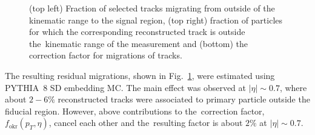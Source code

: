 \begin{figure}[b!]
\begin{subfigure}{.49\textwidth}
	\end{subfigure}
	\begin{minipage}{.49\textwidth}
		\caption{(top left) Fraction of selected tracks migrating from outside of the kinematic range to the signal region, (top right) fraction of particles for which the corresponding reconstructed track is outside the~kinematic range of the measurement and (bottom) the correction factor for migrations of tracks.}
		\label{fig:okr}
	\end{minipage}
\end{figure}

The resulting residual migrations, shown in Fig.~\ref{fig:okr}, were estimated using PYTHIA~8 \ac{SD} embedding \ac{MC}. The main effect  was observed  at $|\eta| \sim 0.7$, where about $2-6\%$ reconstructed tracks were associated to primary particle outside the fiducial region.  However, above contributions to the~correction factor, $f_\textrm{okr}(p_T, \eta)$, cancel each other and  the~resulting factor is about $2\%$ at $|\eta| \sim 0.7$.



\FloatBarrier